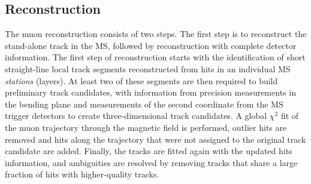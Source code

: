 \subsection{Reconstruction}
The muon reconstruction consists of two steps. 
The first step is to reconstruct the stand-alone track in the MS,
followed by reconstruction with complete detector information.
The first step of reconstruction starts with the identification 
of short straight-line local track segments reconstructed 
from hits in an individual MS \textit{stations} (layers). 
At least two of these segments are then required
to build preliminary track candidates, 
with information from precision measurements in the bending plane 
and measurements of the second coordinate from 
the MS trigger detectors to create three-dimensional track candidates. 
A global $\chi^2$ fit of the muon trajectory 
through the magnetic field is performed,
outlier hits are removed and hits along the trajectory that
were not assigned to the original track candidate are added.
Finally, the tracks are fitted again with the updated hits information,
and ambiguities are resolved by removing tracks
that share a large fraction of hits with higher-quality tracks.

